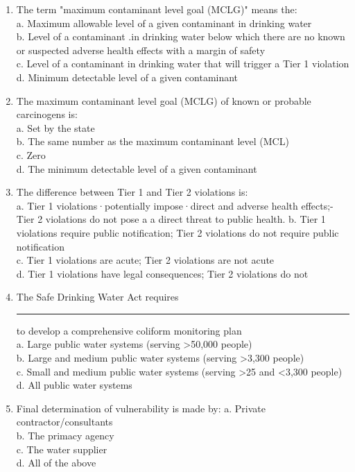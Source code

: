 \documentclass[10pt]{article}
\begin{document}
\begin{enumerate}
\item The term "maximum contaminant level goal (MCLG)" means the:\\ 
a. Maximum allowable level of a given contaminant in drinking water\\
b. Level of a contaminant .in drinking water below which there are no known or suspected adverse health effects with a margin of safety\\
c. Level of a contaminant in drinking water that will trigger a Tier 1 violation\\
d. Minimum detectable level of a given contaminant\\

\item The maximum contaminant level goal (MCLG) of known or probable carcinogens is:\\
a. Set by the state\\
b. The same number as the maximum contaminant level (MCL)\\
c. Zero\\
d. The minimum detectable level of a given contaminant\\

\item The difference between Tier 1 and Tier 2 violations is:\\
a. Tier 1 violations·potentially impose·direct and adverse health effects;-Tier 2 violations do not pose a a direct threat to public health.
b. Tier 1 violations require public notification; Tier 2 violations do not require public notification\\
c. Tier 1 violations are acute; Tier 2 violations are not acute\\
d. Tier 1 violations have legal consequences; Tier 2 violations do not\\

\item The Safe Drinking Water Act requires \rule{1.5cm}{0.1mm} to develop a comprehensive coliform monitoring plan\\
a. Large public water systems (serving >50,000 people)\\
b. Large and medium public water systems (serving >3,300 people)\\
c. Small and medium public water systems (serving >25 and <3,300 people)\\
d. All public water systems\\

\item Final determination of vulnerability is made by:
a. Private contractor/consultants\\
b. The primacy agency\\
c. The water supplier\\
d. All of the above


\end{enumerate}
\end{document}
